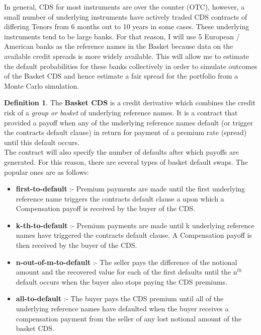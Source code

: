\documentclass{report}
\theoremstyle{plain}
\theoremstyle{definition}
\newtheorem{defn}[thm]{Definition} %
\begin{document}
In general, CDS for most instruments are over the counter (OTC), however, a small number of underlying instruments have actively traded CDS contracts of differing Tenors from 6 months out to 10 years in some cases. These underlying instruments tend to be large banks. For that reason, I will use 5 European / American banks as the reference names in the Basket because data on the available credit spreads is more widely available. This will allow me to estimate the default probabilities for these banks collectively in order to simulate outcomes of the Basket CDS and hence estimate a fair spread for the portfolio from a Monte Carlo simulation.\\

\begin{defn}
	The \textbf{Basket CDS} is a credit derivative which combines the credit risk of a \emph{group or basket} of underlying reference names. It is a contract that provided a payoff when any of the underlying reference names default (or trigger the contracts default clause) in return for payment of a premium rate (spread) until this default occurs.\\
	
	The contract will also specify the number of defaults after which payoffs are generated. For this reason, there are several types of basket default swaps. The popular ones are as follows:
	
	\begin{itemize}
		\item \textbf{first-to-default} :- Premium payments are made until the first underlying reference name triggers the contracts default clause a upon which a Compensation payoff is received by the buyer of the CDS.
		\item \textbf{k-th-to-default} :- Premium payments are made until k underlying reference names have triggered the contracts default clause. A Compensation payoff is then received by the buyer of the CDS.
		\item \textbf{n-out-of-m-to-default} :- The seller pays the difference of the notional amount and the recovered value for each of the first defaults until the n$^{th}$ default occurs when the buyer also stops paying the CDS premiums.
		\item \textbf{all-to-default} :- The buyer pays the CDS premium until all of the underlying reference names have defaulted when the buyer receives a compensation payment from the seller of any lost notional amount of the basket CDS.
	\end{itemize}
\end{defn}
\end{document}
